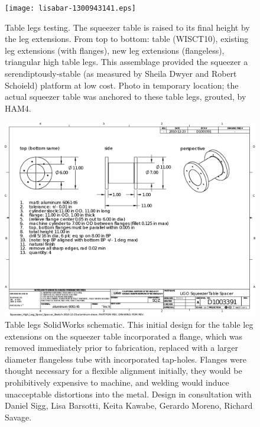 \begin{figure}
\begin{center}
\texttt{[image: lisabar-1300943141.eps]}
\caption{Table legs testing. The squeezer table is raised to its final height by the leg extensions. From top to bottom: table (WISCT10), existing leg extensions (with flanges), new leg extensions (flangeless), triangular high table legs. This assemblage provided the squeezer a serendiptously-stable (as measured by Sheila Dwyer and Robert Schoield) platform at low cost. Photo in temporary location; the actual squeezer table was anchored to these table legs, grouted, by HAM4.
}
\label{table_leg_testing}
\end{center}
\end{figure}




\begin{figure}
\begin{center}
\includegraphics[width=0.6\paperwidth]{Squeezer_High_Leg_Spool_Spacer_2010-12-23_aluminum.eps}
\caption{Table legs SolidWorks schematic. This initial design for the table leg extensions on the squeezer table incorporated a flange, which was removed immediately prior to fabrication, replaced with a larger diameter flangeless tube with incorporated tap-holes. Flanges were thought necessary for a flexible alignment initially, they would be prohibitively expensive to machine, and welding would induce unacceptable distortions into the metal. Design in consultation with Daniel Sigg, Lisa Barsotti, Keita Kawabe, Gerardo Moreno, Richard Savage.
}
\label{spacer_legs_figure}
\end{center}
\end{figure}


